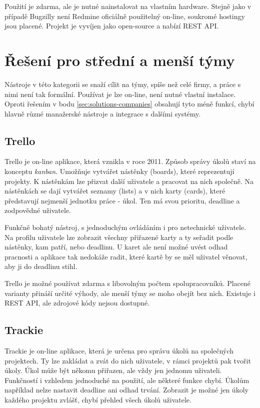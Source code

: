 \documentclass[thesis=B,czech]{FITthesis}[2012/06/26]
\begin{document}
			Použití je zdarma, ale je nutné nainstalovat na vlastním hardware. Stejně jako v případě Bugzilly není Redmine oficiálně použitelný on-line, soukromé hostingy jsou placené. Projekt je vyvíjen jako open-source a nabízí REST API.

	\section{Řešení pro střední a menší týmy}
		\label{sec:solutions-teams}
		Nástroje v této kategorii se snaží cílit na týmy, spíše než celé firmy, a práce s nimi není tak formální. Používat je lze on-line, není nutné vlastní instalace. Oproti řešením v bodu \ref{sec:solutions-companies} obsahují tyto méně funkcí, chybí hlavně různé manažerské nástroje a integrace s dalšími systémy.
	
		\subsection{Trello}
			Trello \cite{trello} je on-line aplikace, která vznikla v roce 2011. Způsob správy úkolů staví na konceptu \textit{kanban}\cite{kanban}. Umožňuje vytvářet nástěnky (boards), které reprezentují projekty. K nástěnkám lze přizvat další uživatele a pracovat na nich společně. Na nástěnkách se dají vytvářet seznamy (lists) a v nich karty (cards), které představují nejmenší jednotku práce - úkol. Ten má svou prioritu, deadline a zodpovědné uživatele.
			
			Funkčně bohatý nástroj, s jednoduchým ovládáním i pro netechnické uživatele. Na profilu uživatele lze zobrazit všechny přiřazené karty a ty seřadit podle nástěnky, kam patří, nebo deadlinu. U karet ale není možné uvést odhad pracnosti a aplikace tak nedokáže radit, které kartě by se měl uživatel věnovat, aby ji do deadlinu stihl.
			
			Trello je možné používat zdarma s libovolným počtem spolupracovníků. Placené varianty přináší určité výhody\cite{trello-pricing}, ale menší týmy se moho obejít bez nich. Existuje i REST API\cite{trello-api}, ale zdrojové kódy nejsou dostupné.
		
			
		\subsection{Trackie}
			Trackie \cite{trackie} je on-line aplikace, která je určena pro správu úkolů na společných projektech. Ty lze zakládat a zvát do nich uživatele, v rámci projektů pak tvořit úkoly. Úkol může být někomu přiřazen, ale vždy jen jednomu uživateli. Funkčností i vzhledem jednoduché na použití, ale některé funkce chybí. Úkolům například nelze nastavit deadline ani odhad trvání. Zobrazit je možné jen úkoly každého projektu zvlášť, chybí přehled všech úkolů uživatele. 
			
\end{document}
